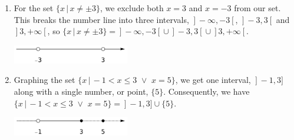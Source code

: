 \begin{example}
\begin{enumerate}
		
		
		\item  For the set $\{ x \, | \, x \neq \pm 3 \}$, we exclude both $x=3$ and $x=-3$ from our set.  This breaks the number line into three intervals, $\left.\right]-\infty, -3\left[\right.$, $\left.\right]-3,3\left[\right.$ and $\left.\right]3, +\infty\left[\right.$, so $\{ x \, | \, x \neq \pm 3 \} = \left.\right]-\infty, -3\left[\right. \cup \left.\right]-3,3\left[\right. \cup \left.\right]3, +\infty\left[\right.$.
		
		
		\begin{center}
			\includegraphics[width=0.4\textwidth]{fig_sets_10b}
		\end{center}
		
		
		\item  Graphing the set $\{ x \, | \, -1 < x \leq 3 \,\, \vee \,\, x = 5\}$, we get one interval, $\left.\right]-1,3]$ along with a single number, or point, $\{ 5\}$.
		Consequently, we have $\{ x \, | \, -1 < x \leq 3 \,\, \vee \,\, x = 5\} = \left.\right]-1,3] \cup \{ 5\}$.
		
		\begin{center}
			\includegraphics[width=0.4\textwidth]{fig_sets_10c}
		\end{center}
		
	\end{enumerate}
	
	
\end{example}
\fi

\ifcourse
\ifanalysis

